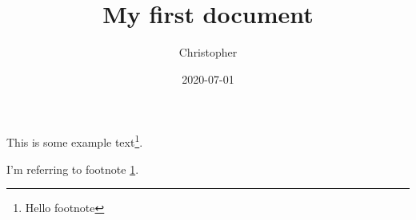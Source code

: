\documentclass{article}
\title{My first document}
\date{2020-07-01}
\author{Christopher}
\begin{document}
	
	This is some example text\footnote{\label{myfootnote}Hello footnote}.
	
	I'm referring to footnote \ref{myfootnote}.
	
\end{document}
